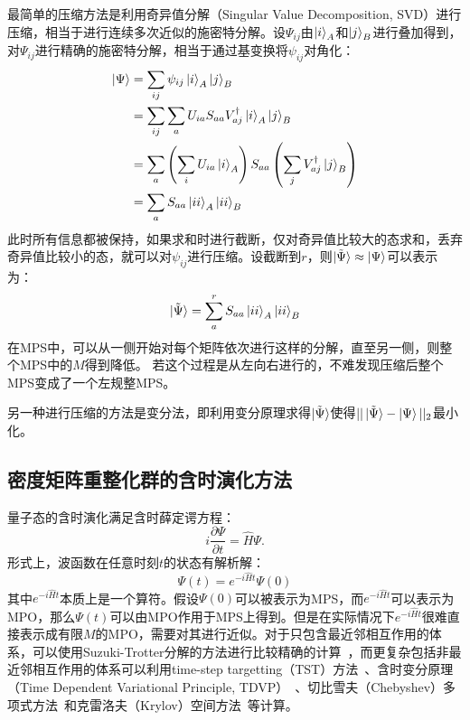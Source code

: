 \documentclass{article}
\begin{document}
最简单的压缩方法是利用奇异值分解（Singular Value Decomposition, SVD）进行压缩，相当于进行连续多次近似的施密特分解。设$\Psi_{ij}$由$\ket{i}_A$和$\ket{j}_B$进行叠加得到，对$\Psi_{ij}$进行精确的施密特分解，相当于通过基变换将$\psi_{ij}$对角化：
\begin{equation}
    \begin{aligned}
        \ket{\Psi} & = \sum_{ij} \psi_{ij} \ket{i}_A \ket{j}_B \\
        & = \sum_{ij} \sum_a U_{ia}S_{aa}V_{aj}^{\dag} \ket{i}_A \ket{j}_B \\
        & = \sum_a \left ( \sum_i U_{ia} \ket{i}_A \right ) S_{aa} \left ( \sum_j V_{aj}^{\dag} \ket{j}_B \right ) \\
        & = \sum_a S_{aa} \ket{ii}_A \ket{ii}_B
    \end{aligned}
\end{equation}
此时所有信息都被保持，如果求和时进行截断，仅对奇异值比较大的态求和，丢弃奇异值比较小的态，就可以对$\psi_{ij}$进行压缩。设截断到$r$，则$\ket{\tilde \Psi} \approx \ket{\Psi}$可以表示为：
\begin{equation}
    \ket{\tilde \Psi} = \sum_a^r S_{aa} \ket{ii}_A \ket{ii}_B
\end{equation}
在MPS中，可以从一侧开始对每个矩阵依次进行这样的分解，直至另一侧，则整个MPS中的$M$得到降低。
若这个过程是从左向右进行的，不难发现压缩后整个MPS变成了一个左规整MPS。

另一种进行压缩的方法是变分法，即利用变分原理求得$\ket{\tilde \Psi}$使得$||\ket{\tilde \Psi} - \ket{\Psi}||_2$最小化。

\subsection{密度矩阵重整化群的含时演化方法}
量子态的含时演化满足含时薛定谔方程：
\begin{equation}
    i\frac{\partial \Psi}{\partial t} = \hat H \Psi.
\end{equation}
形式上，波函数在任意时刻$t$的状态有解析解：
\begin{equation}
    \Psi(t) = e^{-i\hat{H}t} \Psi(0)
\end{equation}
其中$e^{-i\hat{H}t}$本质上是一个算符。假设$\Psi(0)$可以被表示为MPS，而$e^{-i\hat{H}t}$可以表示为MPO，那么$\Psi(t)$可以由MPO作用于MPS上得到。但是在实际情况下$e^{-i\hat{H}t}$很难直接表示成有限$M$的MPO，需要对其进行近似。对于只包含最近邻相互作用的体系，可以使用Suzuki-Trotter分解的方法进行比较精确的计算~\cite{Vidal04}，而更复杂包括非最近邻相互作用的体系可以利用time-step targetting（TST）方法~\cite{White05td, Garnet17}、含时变分原理（Time Dependent Variational Principle, TDVP）~\cite{Manthe92, Wang181, WANG182, LUBICH16}、切比雪夫（Chebyshev）多项式方法~\cite{Holzner11, Halimeh15}和克雷洛夫（Krylov）空间方法~\cite{Scholl05}等计算。
\end{document}

